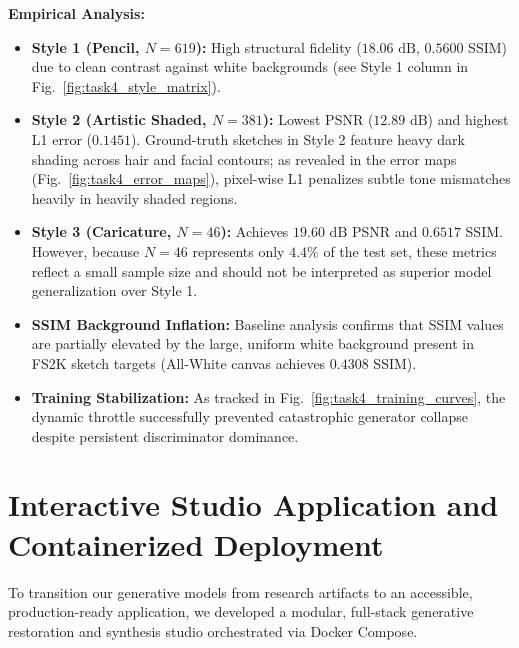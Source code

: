\documentclass[conference]{IEEEtran}
\begin{document}
\textbf{Empirical Analysis:}
\begin{itemize}
    \item \textbf{Style 1 (Pencil, $N=619$):} High structural fidelity ($18.06\text{ dB}$, $0.5600$ SSIM) due to clean contrast against white backgrounds (see Style 1 column in Fig.~\ref{fig:task4_style_matrix}).
    \item \textbf{Style 2 (Artistic Shaded, $N=381$):} Lowest PSNR ($12.89\text{ dB}$) and highest L1 error ($0.1451$). Ground-truth sketches in Style 2 feature heavy dark shading across hair and facial contours; as revealed in the error maps (Fig.~\ref{fig:task4_error_maps}), pixel-wise L1 penalizes subtle tone mismatches heavily in heavily shaded regions.
    \item \textbf{Style 3 (Caricature, $N=46$):} Achieves $19.60\text{ dB}$ PSNR and $0.6517$ SSIM. However, because $N=46$ represents only $4.4\%$ of the test set, these metrics reflect a small sample size and should not be interpreted as superior model generalization over Style 1.
    \item \textbf{SSIM Background Inflation:} Baseline analysis confirms that SSIM values are partially elevated by the large, uniform white background present in FS2K sketch targets (All-White canvas achieves $0.4308$ SSIM).
    \item \textbf{Training Stabilization:} As tracked in Fig.~\ref{fig:task4_training_curves}, the dynamic throttle successfully prevented catastrophic generator collapse despite persistent discriminator dominance.
\end{itemize}

\section{Interactive Studio Application and Containerized Deployment}
To transition our generative models from research artifacts to an accessible, production-ready application, we developed a modular, full-stack generative restoration and synthesis studio orchestrated via Docker Compose.
\end{document}
